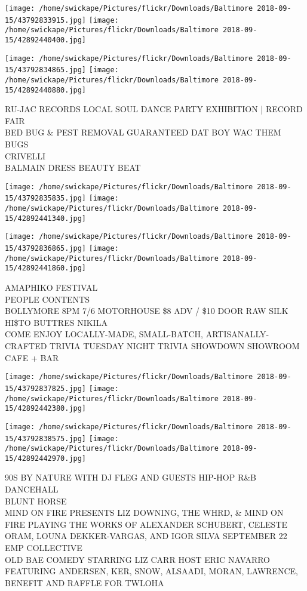 \documentclass[10pt,letterpaper]{article}
\begin{document}
\texttt{[image: /home/swickape/Pictures/flickr/Downloads/Baltimore 2018-09-15/43792833915.jpg]}
\texttt{[image: /home/swickape/Pictures/flickr/Downloads/Baltimore 2018-09-15/42892440400.jpg]}

\texttt{[image: /home/swickape/Pictures/flickr/Downloads/Baltimore 2018-09-15/43792834865.jpg]}
\texttt{[image: /home/swickape/Pictures/flickr/Downloads/Baltimore 2018-09-15/42892440880.jpg]}

RU{-}JAC RECORDS LOCAL SOUL DANCE PARTY EXHIBITION | RECORD FAIR\\
BED BUG \& PEST REMOVAL GUARANTEED DAT BOY WAC THEM BUGS\\
CRIVELLI\\
BALMAIN DRESS BEAUTY BEAT
\pagebreak

\texttt{[image: /home/swickape/Pictures/flickr/Downloads/Baltimore 2018-09-15/43792835835.jpg]}
\texttt{[image: /home/swickape/Pictures/flickr/Downloads/Baltimore 2018-09-15/42892441340.jpg]}

\texttt{[image: /home/swickape/Pictures/flickr/Downloads/Baltimore 2018-09-15/43792836865.jpg]}
\texttt{[image: /home/swickape/Pictures/flickr/Downloads/Baltimore 2018-09-15/42892441860.jpg]}

AMAPHIKO FESTIVAL\\
PEOPLE CONTENTS\\
BOLLYMORE 8PM 7/6 MOTORHOUSE \$8 ADV / \$10 DOOR RAW SILK HI\$TO BUTTRES NIKILA\\
COME ENJOY LOCALLY{-}MADE, SMALL{-}BATCH, ARTISANALLY{-}CRAFTED TRIVIA TUESDAY NIGHT TRIVIA SHOWDOWN SHOWROOM CAFE + BAR
\pagebreak

\texttt{[image: /home/swickape/Pictures/flickr/Downloads/Baltimore 2018-09-15/43792837825.jpg]}
\texttt{[image: /home/swickape/Pictures/flickr/Downloads/Baltimore 2018-09-15/42892442380.jpg]}

\texttt{[image: /home/swickape/Pictures/flickr/Downloads/Baltimore 2018-09-15/43792838575.jpg]}
\texttt{[image: /home/swickape/Pictures/flickr/Downloads/Baltimore 2018-09-15/42892442970.jpg]}

90S BY NATURE WITH DJ FLEG AND GUESTS HIP{-}HOP R\&B DANCEHALL\\
BLUNT HORSE\\
MIND ON FIRE PRESENTS LIZ DOWNING, THE WHRD, \& MIND ON FIRE PLAYING THE WORKS OF ALEXANDER SCHUBERT, CELESTE ORAM, LOUNA DEKKER{-}VARGAS, AND IGOR SILVA SEPTEMBER 22 EMP COLLECTIVE\\
OLD BAE COMEDY STARRING LIZ CARR HOST ERIC NAVARRO FEATURING ANDERSEN, KER, SNOW, ALSAADI, MORAN, LAWRENCE, BENEFIT AND RAFFLE FOR TWLOHA
\pagebreak
\end{document}
